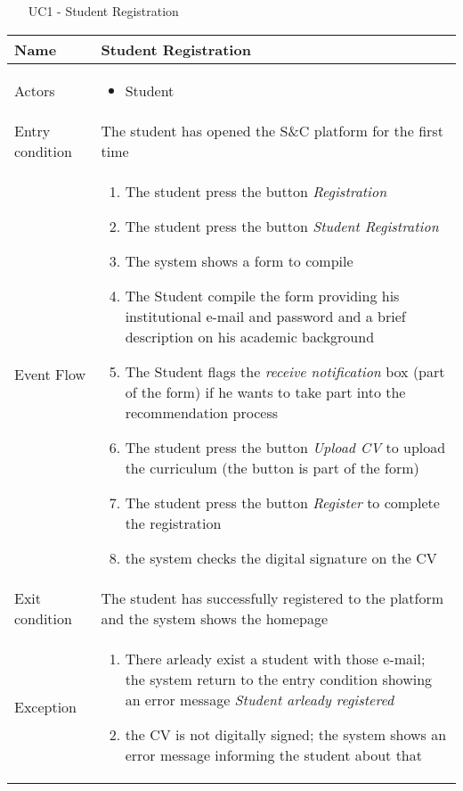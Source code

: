			\begin{table} [H]
				\centering
				\begin{itemize}
					\item [UC1] - Student Registration
				\end{itemize}
				\begin{tabular}{|| P{7.5cm} | P{7.5cm} ||}
					\hline
					Name & Student Registration \\
					\hline
					Actors & \parbox{5cm}{\begin{itemize}
							\item Student
							\end{itemize}
						} \\
					\hline
					Entry condition & The student has opened the S\&C platform for the first time \\
					\hline
					Event Flow & \parbox{5cm}{\begin{enumerate}[label=\alpha]
						\item The student press the button \textit{Registration}
						\item The student press the button \textit{Student Registration}
						\item The system shows a form to compile
						\item The Student compile the form providing his institutional e-mail and password and a brief description on his academic 
						background
						\item The Student flags the \textit{receive 
						notification} box (part of the form) 
						if he wants to take part into the recommendation process 
						\item The student press the button 
						\textit{Upload CV} to upload the 
						curriculum (the button is part of 
						the form)
						\item The student press the button 
						\textit{Register} to complete the 
						registration
						\item the system checks the digital signature on the CV
						\end{enumerate}} \\
					\hline 
					Exit condition & The student has successfully registered 
					to the platform and the system shows the 
					homepage \\
					\hline
					Exception &	\parbox{5cm}{\begin{enumerate}[label=\alpha]
							\item There arleady exist a student with 
							those e-mail; the system return to 
							the entry condition showing an 
							error message \textit{Student arleady 
							registered}
							\item the CV is not digitally signed; the system shows an error message informing the student about that
							\end{enumerate}} \\
					\hline
				\end{tabular}
			\end{table}
			

